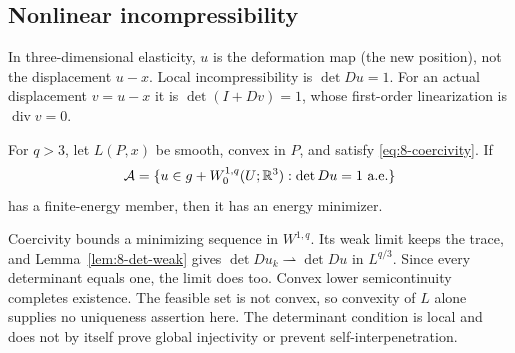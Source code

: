 \subsection{Nonlinear incompressibility}
In three-dimensional elasticity, $u$ is the deformation map (the new
position), not the displacement $u-x$. Local incompressibility is
$\det Du=1$. For an actual displacement $v=u-x$ it is
$\det(I+Dv)=1$, whose first-order linearization is $\operatorname{div}v=0$.
\Needspace{55mm}
\begin{theorem}
For $q>3$, let $L(P,x)$ be smooth, convex in $P$, and satisfy
\eqref{eq:8-coercivity}. If
\[
 \mathcal A=\{u\in g+W^{1,q}_0(U;\mathbb{R}^3):\det Du=1\text{ a.e.}\}
\]
has a finite-energy member, then it has an energy minimizer.
\end{theorem}
\begin{expandedproof}
Coercivity bounds a minimizing sequence in $W^{1,q}$.
Its weak limit keeps the trace, and Lemma~\ref{lem:8-det-weak} gives
$\det Du_k\rightharpoonup\det Du$ in $L^{q/3}$.
Since every determinant equals one, the limit does too. Convex lower
semicontinuity completes existence. The feasible set is not convex,
so convexity of $L$ alone supplies no uniqueness assertion here.
The determinant condition is local and does not by itself prove global
injectivity or prevent self-interpenetration.
\end{expandedproof}
